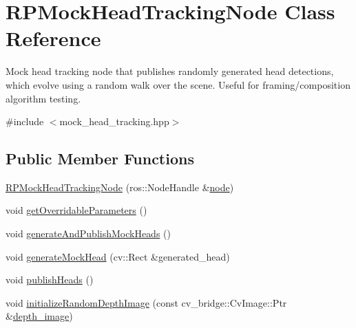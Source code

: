 \hypertarget{class_r_p_mock_head_tracking_node}{\section{\-R\-P\-Mock\-Head\-Tracking\-Node \-Class \-Reference}
\label{class_r_p_mock_head_tracking_node}
}


\-Mock head tracking node that publishes randomly generated head detections, which evolve using a random walk over the scene. \-Useful for framing/composition algorithm testing.  




{\ttfamily \#include $<$mock\-\_\-head\-\_\-tracking.\-hpp$>$}

\subsection*{\-Public \-Member \-Functions}
\begin{DoxyCompactItemize}
\item 
\hyperlink{class_r_p_mock_head_tracking_node_aa4543f859850e3b59dd452b6130cae30}{\-R\-P\-Mock\-Head\-Tracking\-Node} (ros\-::\-Node\-Handle \&\hyperlink{class_r_p_mock_head_tracking_node_a2294de9d2f407990783725f89aca9f43}{node})
\item 
void \hyperlink{class_r_p_mock_head_tracking_node_aba24032613272b902fa46de867036b36}{get\-Overridable\-Parameters} ()
\item 
void \hyperlink{class_r_p_mock_head_tracking_node_aa565b90163780a4a5c8602e006020603}{generate\-And\-Publish\-Mock\-Heads} ()
\item 
void \hyperlink{class_r_p_mock_head_tracking_node_ab9b38d32668df19b25b247ba560f5100}{generate\-Mock\-Head} (cv\-::\-Rect \&generated\-\_\-head)
\item 
void \hyperlink{class_r_p_mock_head_tracking_node_a6da2db9e3d11a3edf49d3ddfe43c2def}{publish\-Heads} ()
\item 
void \hyperlink{class_r_p_mock_head_tracking_node_a0a8464108241e61fdd56c8a92354a8b6}{initialize\-Random\-Depth\-Image} (const cv\-\_\-bridge\-::\-Cv\-Image\-::\-Ptr \&\hyperlink{class_r_p_mock_head_tracking_node_a94d8f99ef984c889f722bc6da057df5f}{depth\-\_\-image})
\end{DoxyCompactItemize}
